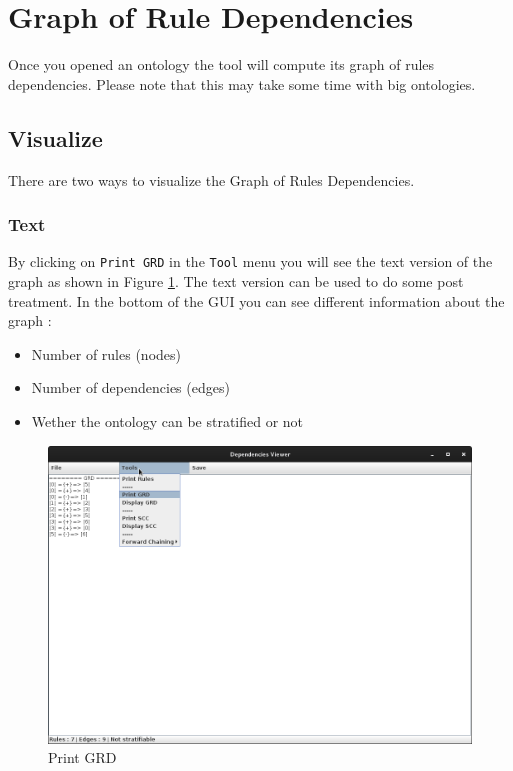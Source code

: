 \documentclass[a4paper, 10pt]{article}
\begin{document}
\newpage

\section{Graph of Rule Dependencies}
Once you opened an ontology the tool will compute its graph of rules dependencies. Please note that this may take some time with big ontologies.
\subsection{Visualize}
There are two ways to visualize the Graph of Rules Dependencies.
\subsubsection{Text}
By clicking on \verb=Print GRD= in the \verb=Tool= menu you will see the text version of the graph as shown in Figure \ref{fig4}. The text version can be used to do some post treatment. In the bottom of the GUI you can see different information about the graph :
\begin{itemize}
\item Number of rules (nodes)
\item Number of dependencies (edges)
\item Wether the ontology can be stratified or not
\end{itemize}

\begin{figure}
  \begin{center}
    \includegraphics[scale=0.25]{pics/fig4.png}
    \caption{Print GRD}
  \end{center}
  \label{fig4}
\end{figure}
\end{document}
